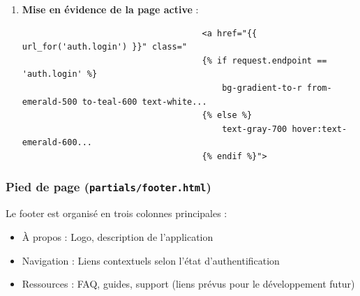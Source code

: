 \documentclass[a4paper,11pt]{article}
\begin{document}
\begin{enumerate}
                        \item \textbf{Mise en évidence de la page active} :
                            \begin{tcolorbox}[colback=lightgray!6, colframe=black, left=-60mm, right=5mm, top=2mm, bottom=0mm, boxrule=0.1mm]
                                \begin{verbatim}
                                    <a href="{{ url_for('auth.login') }}" class="
                                    {% if request.endpoint == 'auth.login' %}
                                        bg-gradient-to-r from-emerald-500 to-teal-600 text-white...
                                    {% else %}
                                        text-gray-700 hover:text-emerald-600...
                                    {% endif %}">
                                \end{verbatim}
                            \end{tcolorbox}
                    \end{enumerate}

                \subsubsection{Pied de page (\texttt{partials/footer.html})}
                    \noindent Le footer est organisé en trois colonnes principales :
                    \begin{itemize}
                        \item À propos : Logo, description de l'application
                        \item Navigation : Liens contextuels selon l'état d'authentification
                        \item Ressources : FAQ, guides, support (liens prévus pour le développement futur)
                    \end{itemize}
\end{document}
